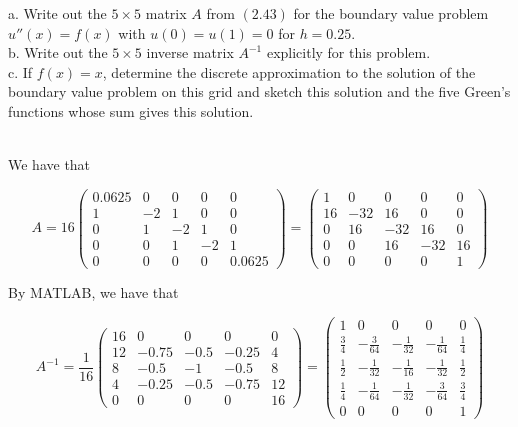 a. Write out the $5\times5$ matrix $A$ from $(2.43)$ for the boundary value problem $u''(x)=f(x)$ with
$u(0)=u(1)=0$ for $h=0.25$.\\
b. Write out the $5\times5$ inverse matrix $A^{-1}$ explicitly for this problem.\\
c. If $f(x)=x$, determine the discrete approximation to the solution of the boundary value problem on
this grid and sketch this solution and the five Green's functions whose sum gives this solution.

\begin{solution}\renewcommand{\qedsymbol}{}\ \\
    We have that
    
    $$A=16\left(\begin{array}{ccccc} 0.0625 & 0 & 0 & 0 & 0 \\ 1 & -2 & 1 & 0 & 0 \\ 0 & 1 & -2 & 1 & 0
                                  \\ 0 & 0 & 1 & -2 & 1 \\ 0 & 0 & 0 & 0 & 0.0625 \end{array}\right)=
          \left(\begin{array}{ccccc} 1 & 0 & 0 & 0 & 0 \\ 16 & -32 & 16 & 0 & 0 \\ 0 & 16 & -32 & 16 & 0
                                  \\ 0 & 0 & 16 & -32 & 16 \\ 0 & 0 & 0 & 0 & 1 \end{array}\right)$$

    By MATLAB, we have that
    
    $$A^{-1}=\frac{1}{16}\left(\begin{array}{ccccc} 16 & 0 & 0 & 0 & 0
                                                 \\ 12 & -0.75 & -0.5 & -0.25 & 4
                                                 \\ 8 & -0.5 & -1 & -0.5 & 8
                                                 \\ 4 & -0.25 & -0.5 & -0.75 & 12
                                                 \\ 0 & 0 & 0 & 0 & 16
                         \end{array}\right)=
    \left(\begin{array}{ccccc} 1 & 0 & 0 & 0 & 0 
                        \\ \frac34 & -\frac{3}{64} & -\frac{1}{32} & -\frac{1}{64} & \frac14
                        \\ \frac12 & -\frac{1}{32} & -\frac{1}{16} & -\frac{1}{32} & \frac12
                        \\ \frac14 & -\frac{1}{64} & -\frac{1}{32} & -\frac{3}{64} & \frac34
                        \\ 0 & 0 & 0 & 0 & 1 
    \end{array}\right)$$


\end{solution}
